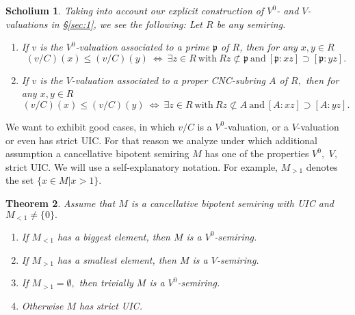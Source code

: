 \documentclass [12pt,a4paper,reqno]{amsart}
\newtheorem{thm}{Theorem} [section]
\newtheorem{schol}[thm]{Scholium}
\begin{document}
\begin{schol}\label{schol2.7}
Taking into account our explicit construction of $V^0$- and
$V$-valuations in \S\ref{sec:1}, we see the following: Let $R$ be
any semiring.
\begin{enumerate}
\item[i)] If $v$ is the $V^0$-valuation associated to a prime
${\mathfrak p}$ of $R$, then for any $x,y\in R$
\begin{equation}\label{2.3}
(v/C)(x)\le (v/C)(y) \ \Leftrightarrow \ \exists z\in R\
\text{with}\  Rz\not\subset{\mathfrak p}\ \text{and}\
[{\mathfrak p}:xz]\supset[{\mathfrak p}:yz].\end{equation} \item[ii)] If $v$ is the
$V$-valuation associated to a proper CNC-subring $A$ of $R,$ then
for any $x,y\in R$
\begin{equation}\label{2.4}
(v/C)(x)\le (v/C)(y) \ \Leftrightarrow  \ \exists z\in R\
\text{with}\ Rz\not\subset A\ \text{and}\ [A:xz]\supset
[A:yz].\end{equation}
\end{enumerate}
\end{schol}

We want to exhibit good cases, in which $v/C$ is a
$V^0$-valuation, or a $V$-valuation or even has strict UIC. For
that reason we analyze under which additional assumption a
cancellative bipotent semiring $M$ has one of the properties
$V^0,$ $V,$ strict UIC. We will use a self-explanatory notation.
For example, $M_{>1}$ denotes the set $\{x\in M|x>1\}.$

\begin{thm}\label{thm2.8} Assume that $M$ is a cancellative
bipotent semiring with UIC and $M_{<1}\ne \{0\}.$
\begin{enumerate}
\item[i)] If $M_{<1}$ has a biggest element, then $M$ is a
$V^0$-semiring. \item[ii)] If $M_{>1}$ has a smallest element,
then $M$ is a $V$-semiring. \item[iii)] If $M_{>1}=\emptyset,$
then trivially $M$ is a $V^0$-semiring. \item[iv)] Otherwise $M$
has strict UIC.\end{enumerate}\end{thm}
\end{document}

